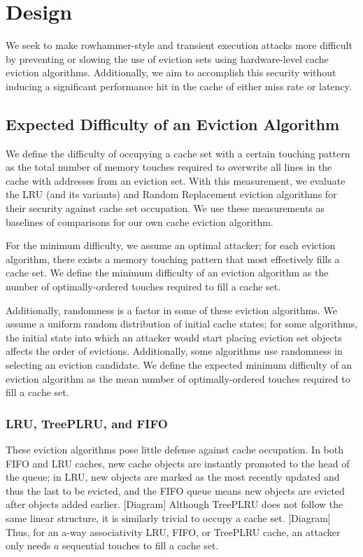 \section{Design}

We seek to make rowhammer-style and transient execution attacks more difficult by preventing or slowing the use of eviction sets
using hardware-level cache eviction algorithms.
Additionally, we aim to accomplish this security without inducing a significant performance hit in the cache of either miss rate or latency.

\subsection{Expected Difficulty of an Eviction Algorithm}
We define the difficulty of occupying a cache set with a certain touching pattern as the total number of memory touches
required to overwrite all lines in the cache with addresses from an eviction set.
With this measurement, we evaluate the LRU (and its variants) and Random Replacement eviction algorithms for their security against cache set occupation.
We use these measurements as baselines of comparisons for our own cache eviction algorithm.

For the minimum difficulty, we assume an optimal attacker;
for each eviction algorithm, there exists a memory touching pattern that most effectively fills a cache set.
We define the minimum difficulty of an eviction algorithm as the number of optimally-ordered touches required to fill a cache set.

Additionally, randomness is a factor in some of these eviction algorithms.
We assume a uniform random distribution of initial cache states;
for some algorithms, the initial state into which an attacker would start placing eviction set objects affects the order of evictions.
Additionally, some algorithms use randomness in selecting an eviction candidate.
We define the expected minimum difficulty of an eviction algorithm as the mean number of optimally-ordered touches required to fill a cache set.

\subsubsection{LRU, TreePLRU, and FIFO}
These eviction algorithms pose little defense against cache occupation.
In both FIFO and LRU caches, new cache objects are instantly promoted to the head of the queue;
in LRU, new objects are marked as the most recently updated and thus the last to be evicted,
and the FIFO queue means new objects are evicted after objects added earlier.
[Diagram]
Although TreePLRU does not follow the same linear structure, it is similarly trivial to occupy a cache set.
[Diagram]
Thus, for an a-way associativity LRU, FIFO, or TreePLRU cache, an attacker only needs $a$ sequential touches to fill a cache set.

